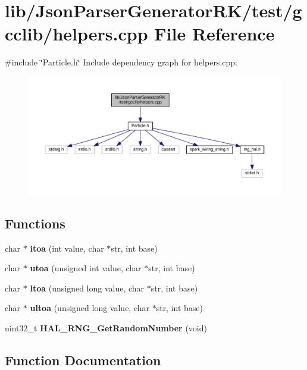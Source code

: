\section{lib/\+Json\+Parser\+Generator\+R\+K/test/gcclib/helpers.cpp File Reference}
\label{helpers_8cpp}
{\ttfamily \#include \char`\"{}Particle.\+h\char`\"{}}\newline
Include dependency graph for helpers.\+cpp\+:\nopagebreak
\begin{figure}[H]
\begin{center}
\leavevmode
\includegraphics[width=350pt]{helpers_8cpp__incl}
\end{center}
\end{figure}
\subsection*{Functions}
\begin{DoxyCompactItemize}
\item 
char $\ast$ \textbf{ itoa} (int value, char $\ast$str, int base)
\item 
char $\ast$ \textbf{ utoa} (unsigned int value, char $\ast$str, int base)
\item 
char $\ast$ \textbf{ ltoa} (unsigned long value, char $\ast$str, int base)
\item 
char $\ast$ \textbf{ ultoa} (unsigned long value, char $\ast$str, int base)
\item 
uint32\+\_\+t \textbf{ H\+A\+L\+\_\+\+R\+N\+G\+\_\+\+Get\+Random\+Number} (void)
\end{DoxyCompactItemize}


\subsection{Function Documentation}
\mbox{\label{helpers_8cpp_abd7eeb850453afdae1e6ac00ecdae295}} 
